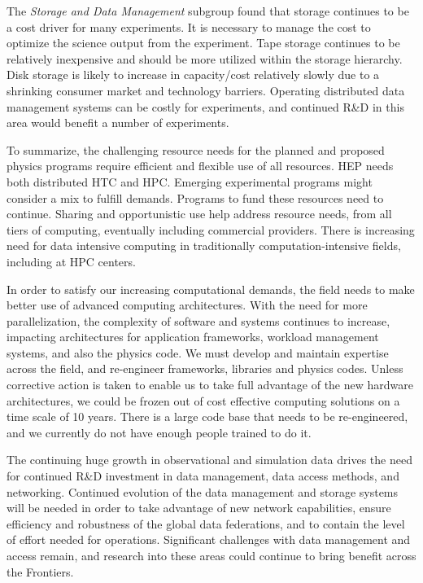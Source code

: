 The {\it Storage and Data Management} subgroup found that storage continues
to be a cost driver for many experiments. It is necessary to manage the
cost to optimize the science output from the experiment. Tape storage
continues to be relatively inexpensive and should be more utilized within
the storage hierarchy. 
Disk storage is likely to increase in capacity/cost relatively slowly due
to a shrinking consumer market and technology barriers.
Operating distributed data management systems can be costly for
experiments, and continued R\&D in this area would benefit a number of 
experiments.

To summarize, the challenging resource needs for the planned and proposed
physics programs require efficient and flexible use of all resources. HEP
needs both distributed HTC and HPC. Emerging experimental programs might
consider a mix to fulfill demands. Programs to fund these resources need to
continue. Sharing and opportunistic use help address resource needs, from
all tiers of computing, eventually including commercial providers. There is
increasing need for data intensive computing in traditionally
computation-intensive fields, including at HPC centers.  %

In order to satisfy our increasing computational demands, the field needs
to make better use of advanced computing architectures. With the need for
more parallelization, the complexity of software and systems continues to
increase, impacting architectures for application frameworks, workload
management systems, and also the physics code. We must develop and maintain
expertise across the field, and re-engineer frameworks, libraries and
physics codes. Unless corrective action is taken to enable us to take full
advantage of the new hardware architectures, we could be frozen out of cost
effective computing solutions on a time scale of 10 years. There is a large
code base that needs to be re-engineered, and we currently do not have
enough people trained to do it.

The continuing huge growth in observational and simulation data drives the
need for continued R\&D investment in data management, data access methods,
and networking. Continued evolution of the data management and storage
systems will be needed in order to take advantage of new network
capabilities, ensure efficiency and robustness of the global data
federations, and to contain the level of effort needed for operations.
Significant challenges with data management and access remain, and research
into these areas could continue to bring benefit across the Frontiers.  


